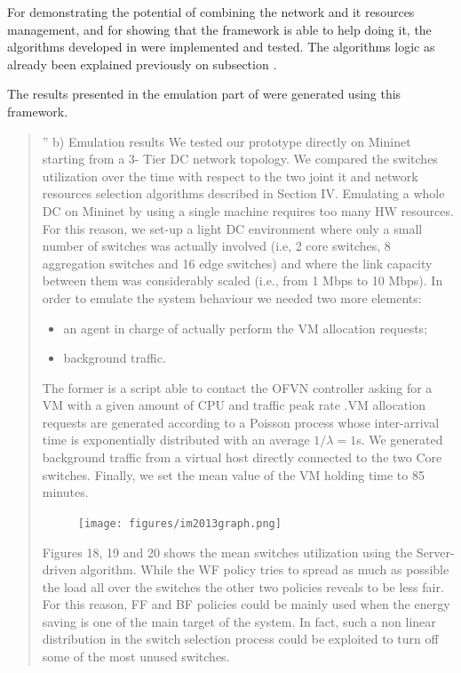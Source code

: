 \documentclass[12pt,english,oneside]{book}
\begin{document}
For demonstrating the potential of combining the network and it resources management, and for showing that the framework is able to help doing it, the algorithms developed in \cite{im2013} were implemented and tested. The algorithms logic as already been explained previously on subsection \label{subsec:userdeflog}.

The results presented in the emulation part of \cite{im2013} were generated using this framework.

\begin{quotation}
''
b) Emulation results 
We tested our prototype directly on Mininet starting from a 3-
Tier DC network topology. We compared the switches utilization 
over the time with respect to the two joint it and network 
resources selection algorithms described in Section IV. 
Emulating a whole DC on Mininet by using a single machine 
requires too many HW resources. For this reason, we set-up a 
light DC environment where only a small number of switches 
was actually involved (i.e, 2 core switches, 8 aggregation 
switches and 16 edge switches) and where the link capacity 
between them was considerably scaled (i.e., from 1 Mbps to 10 
Mbps). In order to emulate the system behaviour we needed two 
more elements: 
\begin{itemize}
\item an agent in charge of actually perform the VM allocation 
requests; 
\item background traffic. 
\end{itemize}
The former is a script able to contact the OFVN controller 
asking for a VM with a given amount of CPU and traffic peak 
rate .VM allocation requests are generated according to a Poisson 
process whose inter-arrival time is exponentially distributed with an average $1/\lambda = 1$s.
We generated background traffic from a virtual host directly 
connected to the two Core switches. Finally, we set the mean 
value of the VM holding time to 85 minutes. 


\begin{figure}[h!tbp]
        \centering
        \texttt{[image: figures/im2013graph.png]}
\end{figure}

Figures 18, 19 and 20 shows the mean switches utilization 
using the Server-driven algorithm. While the WF policy tries to 
spread as much as possible the load all over the switches the 
other two policies reveals to be less fair. For this reason, FF and 
BF policies could be mainly used when the energy saving is one 
of the main target of the system. In fact, such a non linear 
distribution in the switch selection process could be exploited to 
turn off some of the most unused switches. 


\end{quotation}
\end{document}
